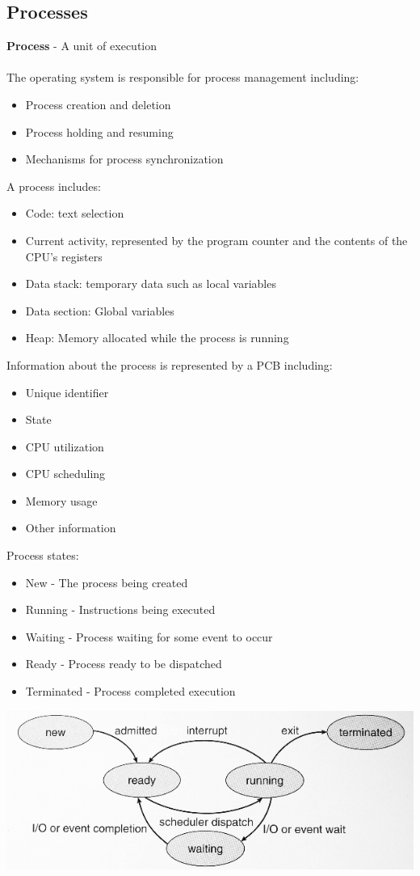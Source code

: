 \documentclass{article}[18pt]
\begin{document}
\subsection{Processes}
\textbf{Process} - A unit of execution\\
\\
The operating system is responsible for process management including:
\begin{itemize}
	\item Process creation and deletion
	\item Process holding and resuming
	\item Mechanisms for process synchronization
\end{itemize}
A process includes:
\begin{itemize}
	\item Code: text selection
	\item Current activity, represented by the program counter and the contents of the CPU's registers
	\item Data stack: temporary data such as local variables
	\item Data section: Global variables
	\item Heap: Memory allocated while the process is running
\end{itemize}
Information about the process is represented by a PCB including:
\begin{itemize}
	\item Unique identifier
	\item State
	\item CPU utilization
	\item CPU scheduling
	\item Memory usage
	\item Other information
\end{itemize}
Process states:
\begin{itemize}
	\item New - The process being created
	\item Running - Instructions being executed
	\item Waiting - Process waiting for some event to occur
	\item Ready - Process ready to be dispatched
	\item Terminated - Process completed execution
\end{itemize}
\begin{center}
	\includegraphics[scale=0.7]{"Process State"}
\end{center}
\end{document}
